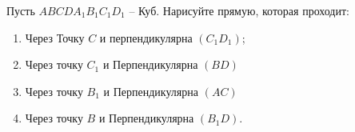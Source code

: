 Пусть $ABCDA_1B_1C_1D_1$ -- Куб. Нарисуйте прямую, которая проходит:

\begin{enumerate}

\item Через Точку $C$ и перпендикулярна $(C_1D_1)$;

\item Через точку $C_1$ и Перпендикулярна $(BD)$

\item Через точку $B_1$ и Перпендикулярна $(AC)$

\item Через точку $B$ и Перпендикулярна $(B_1D)$.

\end{enumerate}